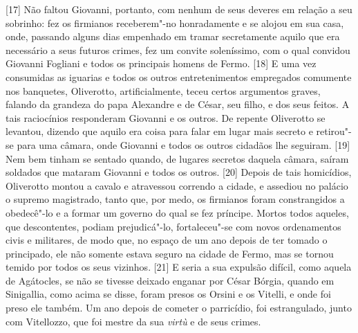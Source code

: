 {[}17{]} Não faltou Giovanni, portanto, com nenhum de seus deveres em
relação a seu sobrinho: fez os firmianos receberem"-no honradamente e se
alojou em sua casa,
onde, passando alguns dias empenhado em tramar secretamente aquilo que
era necessário a seus futuros crimes, fez um convite soleníssimo, com o
qual convidou Giovanni Fogliani e todos os principais homens de Fermo.
{[}18{]} E uma vez consumidas as iguarias e todos os outros
entretenimentos empregados comumente nos banquetes, Oliverotto,
artificialmente, teceu certos argumentos graves, falando da grandeza do
papa Alexandre e de César, seu filho, e dos seus feitos. A tais
raciocínios responderam Giovanni e os outros. De repente Oliverotto se
levantou, dizendo que aquilo era coisa para falar em lugar mais secreto
e retirou"-se para uma câmara, onde Giovanni e todos os outros cidadãos
lhe seguiram. {[}19{]} Nem bem tinham se sentado quando, de lugares
secretos daquela câmara, saíram soldados que mataram Giovanni e todos os
outros. {[}20{]} Depois de tais homicídios, Oliverotto montou a cavalo e
atravessou correndo a cidade, e assediou no palácio o supremo
magistrado, tanto
que, por medo, os firmianos foram constrangidos a obedecê"-lo e a formar
um governo do qual se fez príncipe. Mortos todos aqueles, que
descontentes, podiam prejudicá"-lo, fortaleceu"-se com novos ordenamentos
civis e militares, de modo que, no espaço de um ano depois de ter tomado
o principado, ele não somente estava seguro na cidade de Fermo, mas se
tornou temido por todos os seus vizinhos. {[}21{]} E seria a sua
expulsão difícil, como aquela de Agátocles, se não se tivesse deixado
enganar por César Bórgia, quando em Sinigallia, como acima se
disse, foram presos os Orsini e os
Vitelli, e onde foi preso ele também. Um ano depois de cometer o
parricídio, foi estrangulado, junto com Vitellozzo, que foi mestre
da sua \emph{virtù} e de seus crimes.

